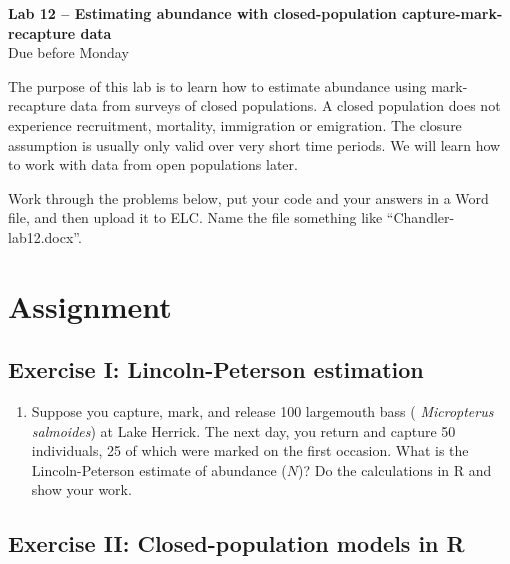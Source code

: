 \documentclass[12pt]{article}\usepackage[]{graphicx}\usepackage[]{color}
\begin{document}
{
  \Large
  \centering
  {\bf Lab 12 -- Estimating abundance with closed-population capture-mark-recapture data \\ }
  Due before Monday \\
}

\vspace{10pt}


The purpose of this lab is to learn how to estimate abundance using
mark-recapture data from surveys of closed populations. A closed
population does not experience recruitment, mortality, immigration or
emigration. The closure assumption is usually only valid over very
short time periods. We will learn how to work with data from open
populations later.

Work through the problems below, put your code and your answers in a
Word file, and then upload it to ELC. Name the file something like 
``Chandler-lab12.docx''.  

\vspace{-6pt}

\section*{Assignment}

\subsection*{Exercise I: Lincoln-Peterson estimation}

\begin{enumerate}
  \item Suppose you capture, mark, and release 100 largemouth bass ({\it
      Micropterus salmoides}) at Lake Herrick. The next day, you return
    and capture 50 individuals, 25 of which were marked on the first
    occasion. What is the Lincoln-Peterson estimate of abundance ($N$)?
    Do the calculations in R and show your work.
\end{enumerate}



\subsection*{Exercise II: Closed-population models in R}
\end{document}
